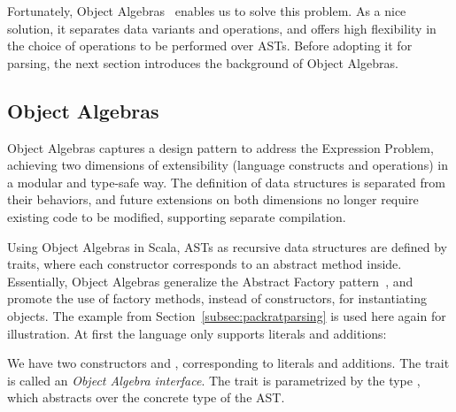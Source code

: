 
Fortunately, Object Algebras~\cite{Oliveira2012} enables us to solve this problem. As a nice solution, it separates data variants
and operations, and offers high flexibility in the choice of operations to be performed over ASTs. Before adopting it for parsing, the next section introduces the background of Object Algebras.

\subsection{Object Algebras}\label{subsec:objectalgebras}
Object Algebras captures a design pattern to address the Expression Problem, achieving two dimensions of extensibility (language constructs and operations) in a modular and type-safe way. The definition of data structures is separated from their behaviors, and future extensions on both dimensions no longer require existing code to be modified, supporting separate compilation.

Using Object Algebras in Scala, ASTs as recursive data structures are defined by traits, where each constructor corresponds to an abstract method inside.
Essentially, Object Algebras generalize the {\sc Abstract Factory} pattern~\cite{}, and promote the use of factory methods, instead of constructors, for instantiating objects. The example from Section~\ref{subsec:packratparsing} is used here again for illustration.
At first the language only supports literals and additions:

We have two constructors  and , corresponding to literals and additions. The trait  is called an \textit{Object Algebra interface}. The trait is parametrized by the type
, which abstracts over the concrete type of the AST.

